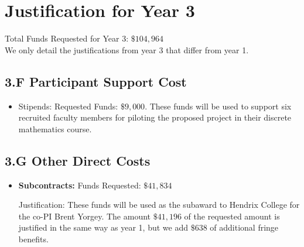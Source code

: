 \documentclass[11pt]{article}
\begin{document}

\section{Justification for Year 3}
\label{sec:justification_for_year_3}

Total Funds Requested for Year 3: $\$104,964$\\

\noindent
We only detail the justifications from year 3 that differ from year 1.

\subsection*{3.F Participant Support Cost }
\label{subsec:3.f_participant_support_cost_}
\begin{itemize}
\item Stipends: Requested Funds: $\$9,000$.  These funds will be used
  to support six recruited faculty members for piloting the proposed
  project in their discrete mathematics course.
\end{itemize}

\subsection*{3.G Other Direct Costs}
\label{subsec:other}

\begin{itemize}
\item \textbf{Subcontracts:} Funds Requested: $\$41,834$

  Justification: These funds will be used as the subaward to Hendrix
  College for the co-PI Brent Yorgey.  The amount $\$41,196$ of the
  requested amount is justified in the same way as year 1, but we add
  $\$638$ of additional fringe benefits.
\end{itemize}

\end{document}
